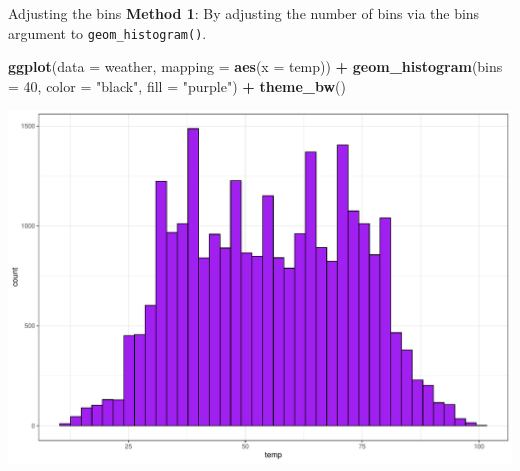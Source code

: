 \documentclass[
  ignorenonframetext,
]{beamer}
\newenvironment{Shaded}{\begin{snugshade}}{\end{snugshade}}
\newcommand{\AttributeTok}[1]{\textcolor[rgb]{0.13,0.29,0.53}{#1}}
\newcommand{\DecValTok}[1]{\textcolor[rgb]{0.00,0.00,0.81}{#1}}
\newcommand{\FunctionTok}[1]{\textcolor[rgb]{0.13,0.29,0.53}{\textbf{#1}}}
\newcommand{\NormalTok}[1]{#1}
\newcommand{\SpecialCharTok}[1]{\textcolor[rgb]{0.81,0.36,0.00}{\textbf{#1}}}
\newcommand{\StringTok}[1]{\textcolor[rgb]{0.31,0.60,0.02}{#1}}
\begin{document}
\begin{frame}[fragile]{Adjusting the bins}
\protect\hypertarget{adjusting-the-bins}{}
\textbf{Method 1}: By adjusting the number of bins via the bins argument
to \texttt{geom\_histogram()}.

\tiny

\begin{Shaded}
\begin{Highlighting}[]
\FunctionTok{ggplot}\NormalTok{(}\AttributeTok{data =}\NormalTok{ weather, }\AttributeTok{mapping =} \FunctionTok{aes}\NormalTok{(}\AttributeTok{x =}\NormalTok{ temp)) }\SpecialCharTok{+}
  \FunctionTok{geom\_histogram}\NormalTok{(}\AttributeTok{bins =} \DecValTok{40}\NormalTok{, }\AttributeTok{color =} \StringTok{"black"}\NormalTok{, }\AttributeTok{fill =} \StringTok{"purple"}\NormalTok{) }\SpecialCharTok{+} 
  \FunctionTok{theme\_bw}\NormalTok{()}
\end{Highlighting}
\end{Shaded}

\begin{center}\includegraphics[width=0.7\linewidth,height=0.5\textheight]{Week2_Lect_files/figure-beamer/unnamed-chunk-28-1} \end{center}
\normalsize
\end{frame}
\end{document}
